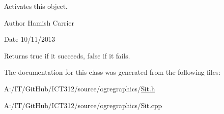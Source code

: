 Activates this object. 

\begin{DoxyAuthor}{Author}
Hamish Carrier 
\end{DoxyAuthor}
\begin{DoxyDate}{Date}
10/11/2013
\end{DoxyDate}
\begin{DoxyReturn}{Returns}
true if it succeeds, false if it fails. 
\end{DoxyReturn}


The documentation for this class was generated from the following files\-:\begin{DoxyCompactItemize}
\item 
A\-:/\-I\-T/\-Git\-Hub/\-I\-C\-T312/source/ogregraphics/\hyperlink{_sit_8h}{Sit.\-h}\item 
A\-:/\-I\-T/\-Git\-Hub/\-I\-C\-T312/source/ogregraphics/Sit.\-cpp\end{DoxyCompactItemize}
